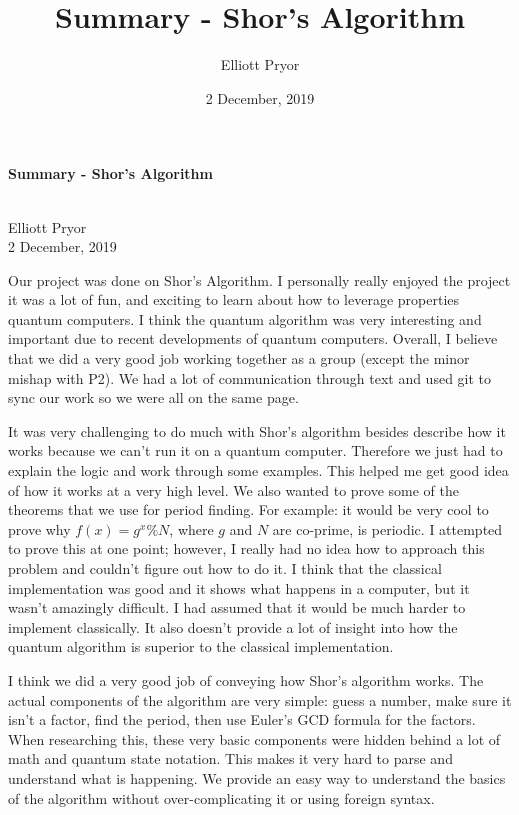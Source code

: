 \documentclass[a4paper]{article}
\title{Summary - Shor's Algorithm}
\author{Elliott Pryor}
\date{2 December, 2019}
\begin{document}
\begin{center}
\begin{Large}
\textbf{Summary - Shor's Algorithm}
\end{Large}\\
Elliott Pryor\\
2 December, 2019
\end{center}
\vspace{0em}
Our project was done on Shor's Algorithm. I personally really enjoyed the project it was a lot of fun,
and exciting to learn about how to leverage properties quantum computers. I think the quantum algorithm was very interesting and important due to recent developments of quantum computers.
Overall, I believe that we did a very good job working together as a group (except the minor mishap with P2).
We had a lot of communication through text and used git to sync our work so we were all on the same page.

It was very challenging to do much with Shor's algorithm besides describe how it works because we can't run it on a quantum computer.
Therefore we just had to explain the logic and work through some examples. This helped me get good idea of how it works at a very high level.
We also wanted to prove some of the theorems that we use for period finding. For example: it would be very cool to prove why $f(x) = g^x \% N$,
where $g$ and $N$ are co-prime, is periodic. I attempted to prove this at one point;
however, I really had no idea how to approach this problem and couldn't figure out how to do it.
I think that the classical implementation was good and it shows what happens in a computer,
but it wasn't amazingly difficult. I had assumed that it would be much harder to implement classically.
It also doesn't provide a lot of insight into how the quantum algorithm is superior to the classical implementation.

I think we did a very good job of conveying how Shor's algorithm works. The actual components of the algorithm are very simple: guess a number,
make sure it isn't a factor, find the period, then use Euler's GCD formula for the factors.
When researching this, these very basic components were hidden behind a lot of math and quantum state notation.
This makes it very hard to parse and understand what is happening. We provide an easy way to  understand the basics of the algorithm without over-complicating it or using foreign syntax.
\end{document}
